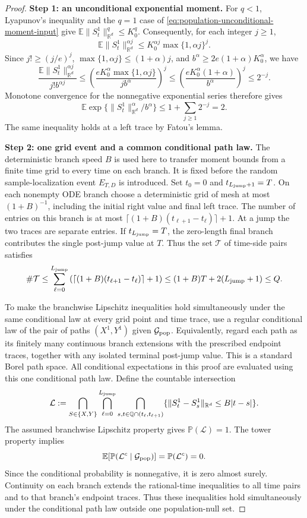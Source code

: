 \begin{proof}
\noindent\textbf{Step 1: an unconditional exponential moment.}
For $q<1$, Lyapunov's inequality and the $q=1$ case of
\eqref{eq:population-unconditional-moment-input} give
$\mathbb E\|S_t^1\|_{\mathbb R^d}^q\le K_0^q$.
Consequently, for each integer $j\ge1$,
\[
 \mathbb E\|S_t^1\|_{\mathbb R^d}^{\alpha j}
 \le K_0^{\alpha j}\max\{1,\alpha j\}^{j}.
\]
Since $j!\ge(j/e)^j$, $\max\{1,\alpha j\}\le(1+\alpha)j$, and
$b^\alpha\ge2e(1+\alpha)K_0^\alpha$, we have
\[
 \frac{\mathbb E\|S_t^1\|_{\mathbb R^d}^{\alpha j}}{j!b^{\alpha j}}
 \le\left(\frac{eK_0^\alpha\max\{1,\alpha j\}}{jb^\alpha}\right)^j
 \le\left(\frac{eK_0^\alpha(1+\alpha)}{b^\alpha}\right)^j
 \le2^{-j}.
\]
Monotone convergence for the nonnegative exponential series therefore gives
\[
 \mathbb E\exp\{\|S_t^1\|_{\mathbb R^d}^\alpha/b^\alpha\}
 \le1+\sum_{j\ge1}2^{-j}=2.
\]
The same inequality holds at a left trace by Fatou's lemma.

\par\noindent\textbf{Step 2: one grid event and a common conditional path law.}
The deterministic branch speed $B$ is used here to transfer moment bounds
from a finite time grid to every time on each branch. It is fixed before the
random sample-localization event $E_{T,D}$ is introduced.
Set $t_0=0$ and $t_{L_{\mathrm{jump}}+1}=T$.
On each nonempty ODE branch choose a deterministic grid of mesh at most
$(1+B)^{-1}$, including the initial right value and final left trace.
The number of entries on this branch is at most
$\lceil(1+B)(t_{\ell+1}-t_\ell)\rceil+1$.
At a jump the two traces are separate entries. If $t_{L_{\mathrm{jump}}}=T$, the
zero-length final branch contributes the single post-jump value at $T$.
Thus the set $\mathcal T$ of time-side pairs satisfies
\[
 \#\mathcal T
 \le\sum_{\ell=0}^{L_{\mathrm{jump}}}
     \left(\left\lceil(1+B)(t_{\ell+1}-t_\ell)\right\rceil+1\right)
 \le(1+B)T+2(L_{\mathrm{jump}}+1)\le Q.
\]

To make the branchwise Lipschitz inequalities hold simultaneously under the
same conditional law at every grid point and time trace, use a regular
conditional law of the pair of paths $(X^1,Y^1)$ given
$\mathcal G_{\rm pop}$. Equivalently, regard each path as its finitely
many continuous branch extensions with the prescribed endpoint traces,
together with any isolated terminal post-jump value. This is a
standard Borel path space. All conditional expectations in this proof
are evaluated using this one conditional path law.
Define the countable intersection
\[
 \mathcal L:=\bigcap_{S\in\{X,Y\}}
  \bigcap_{\ell=0}^{L_{\mathrm{jump}}}
  \bigcap_{s,t\in\mathbb Q\cap(t_\ell,t_{\ell+1})}
   \{\|S_t^1-S_s^1\|_{\mathbb R^d}\le B|t-s|\}.
\]
The assumed branchwise Lipschitz property gives $\mathbb P(\mathcal L)=1$.
The tower property implies
\[
 \mathbb E[\mathbb P(\mathcal L^c\mid\mathcal G_{\rm pop})]
 =\mathbb P(\mathcal L^c)=0.
\]
Since the conditional probability is nonnegative, it is zero almost surely.
Continuity on each branch extends the rational-time inequalities to all
time pairs and to that branch's endpoint traces. Thus these inequalities
hold simultaneously under the conditional path law outside one
population-null set.


\end{proof}
